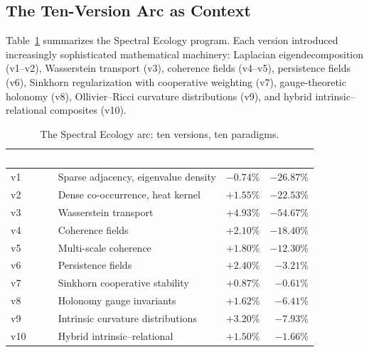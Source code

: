 \documentclass{../yalumba}
\begin{document}
\subsection{The Ten-Version Arc as Context}

Table~\ref{tab:arc-summary} summarizes the Spectral Ecology program.
Each version introduced increasingly sophisticated mathematical
machinery: Laplacian eigendecomposition (v1--v2), Wasserstein transport
(v3), coherence fields (v4--v5), persistence fields (v6), Sinkhorn
regularization with cooperative weighting (v7), gauge-theoretic holonomy
(v8), Ollivier--Ricci curvature distributions (v9), and hybrid
intrinsic--relational composites (v10).

\begin{table}[htbp]
\centering
\tablestyle
\caption{The Spectral Ecology arc: ten versions, ten paradigms.}
\label{tab:arc-summary}
\begin{tabular}{@{}llrr@{}}
\toprule
\rowcolor{table-header}
\textcolor{white}{\textbf{Version}} &
\textcolor{white}{\textbf{Core Idea}} &
\textcolor{white}{\textbf{Sep.}} &
\textcolor{white}{\textbf{Gap}} \\
\midrule
v1 & Sparse adjacency, eigenvalue density  & $-0.74\%$ & $-26.87\%$ \\
v2 & Dense co-occurrence, heat kernel      & $+1.55\%$ & $-22.53\%$ \\
v3 & Wasserstein transport                 & $+4.93\%$ & $-54.67\%$ \\
v4 & Coherence fields                      & $+2.10\%$ & $-18.40\%$ \\
v5 & Multi-scale coherence                 & $+1.80\%$ & $-12.30\%$ \\
v6 & Persistence fields                    & $+2.40\%$ & $-3.21\%$ \\
v7 & Sinkhorn cooperative stability        & $+0.87\%$ & $-0.61\%$ \\
v8 & Holonomy gauge invariants             & $+1.62\%$ & $-6.41\%$ \\
v9 & Intrinsic curvature distributions     & $+3.20\%$ & $-7.93\%$ \\
v10 & Hybrid intrinsic--relational         & $+1.50\%$ & $-1.66\%$ \\
\bottomrule
\end{tabular}
\end{table}

\end{document}

